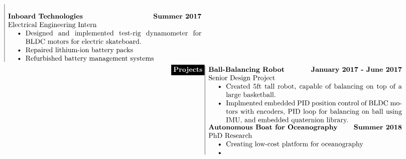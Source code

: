 \documentclass[paper=a4,fontsize=10pt]{article} %
\def \mainColWidth {0.8\textwidth}		%
\def \leftColWidth {0.125\textwidth}		%
\begin{document}
\begin{align*}
\begin{array}[t]{|l}
{		}%
		\\
		\parbox[t]{\mainColWidth}{%
		\textbf{Inboard Technologies} \hfill \textbf{Summer 2017}\\
		\quad Electrical Engineering Intern
		\begin{itemize}[noitemsep,topsep=0pt]
		\item Designed and implemented test-rig dynamometer for BLDC motors for electric skateboard.
		\item Repaired lithium-ion battery packs
		\item Refurbished battery management systems
		\end{itemize}
		}%
	\end{array}
	\\
	\begin{array}[t]{l} 
	\parbox[t]{\leftColWidth}{%
		\colorbox{black}{\color{white}{\textbf{Projects}}}
	}%
	\end{array}
	&
	\begin{array}[t]{|l}
	\parbox[t]{\mainColWidth}{%
		\textbf{Ball-Balancing Robot} \hfill \textbf{January 2017 - June 2017}\\
		\quad Senior Design Project
		\begin{itemize}[noitemsep,topsep=0pt]
		\item Created 5ft tall robot, capable of balancing on top of a large basketball.
		\item Implmented embedded PID position control of BLDC motors with encoders, PID loop for balancing on ball using IMU, and  embedded quaternion library.
		\end{itemize}
	}%
	\\
	\parbox[t]{\mainColWidth}{%
		\textbf{Autonomous Boat for Oceanography}  \hfill \textbf{Summer 2018}\\
		\quad PhD Research
		\begin{itemize}[noitemsep,topsep=0pt]
		\item Creating low-cost platform for oceanography
		\item 
		\end{itemize}
	}%
	\\
	\end{array}
	\\

\end{align*}
\end{document}
